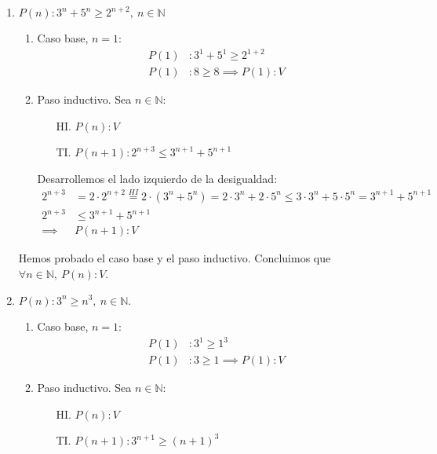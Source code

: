 \begin{enumerate}[label=\roman*)]
    \item $P(n): 3^n + 5^n \geq 2^{n+2},\ n \in \mathbb{N}$
    \begin{enumerate}[label=\arabic*)]
        \item Caso base, $n = 1$:
        \begin{align*}
            P(1)&: 3^1 + 5^1 \geq 2^{1+2} \\
            P(1)&: 8 \geq 8 \implies P(1): V
        \end{align*}
        \item Paso inductivo. Sea $n \in \mathbb{N}$:
        \begin{enumerate}
            \item[HI.] $P(n): V$
            \item[TI.] $P(n+1): 2^{n+3} \leq 3^{n+1} + 5^{n+1}$  
        \end{enumerate}

        Desarrollemos el lado izquierdo de la desigualdad: 
        \begin{align*}
            2^{n+3} &= 2 \cdot 2^{n+2} \overset{HI}{=} 2 \cdot (3^n + 5^n) = 2 \cdot 3^n + 2 \cdot 5^n \leq
            3 \cdot 3^n + 5 \cdot 5^n = 3^{n+1} + 5^{n+1} \\
            2^{n+3} &\leq 3^{n+1} + 5^{n+1} \\
           \implies &P(n+1): V
        \end{align*}         
    \end{enumerate}

    Hemos probado el caso base y el paso inductivo. Concluimos que $\forall n \in \mathbb{N}, \ P(n): V$.


    \item $P(n): 3^n \geq n^3, \ n \in \mathbb{N}$.
    \begin{enumerate}[label=\arabic*)]
        \item Caso base, $n = 1$:
        \begin{align*}
            P(1)&: 3^1 \geq 1^3 \\ 
            P(1)&: 3 \geq 1 \implies P(1): V
        \end{align*}
        \item Paso inductivo. Sea $n \in \mathbb{N}$:
        \begin{enumerate}
            \item[HI.] $P(n): V$
            \item[TI.] $P(n+1): 3^{n+1} \geq (n+1)^3$  
        \end{enumerate}


\end{enumerate}
\end{enumerate}
